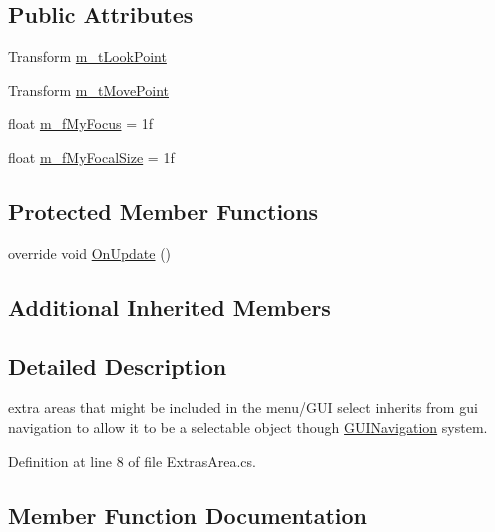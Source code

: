 \subsection*{Public Attributes}
\begin{DoxyCompactItemize}
\item 
Transform \mbox{\hyperlink{class_extras_area_a25c159aed324b87e3fd0a45a6091bc8b}{m\+\_\+t\+Look\+Point}}
\item 
Transform \mbox{\hyperlink{class_extras_area_aec9aa3f2ffb77e4cf45c149b04a6295d}{m\+\_\+t\+Move\+Point}}
\item 
float \mbox{\hyperlink{class_extras_area_aabc862a0031c2e3aa6921ea9a4a60b81}{m\+\_\+f\+My\+Focus}} = 1f
\item 
float \mbox{\hyperlink{class_extras_area_aa377d35bbc6646a177afd002a542f472}{m\+\_\+f\+My\+Focal\+Size}} = 1f
\end{DoxyCompactItemize}
\subsection*{Protected Member Functions}
\begin{DoxyCompactItemize}
\item 
override void \mbox{\hyperlink{class_extras_area_a192d236722e7a6e72facab01513a1d9c}{On\+Update}} ()
\end{DoxyCompactItemize}
\subsection*{Additional Inherited Members}


\subsection{Detailed Description}
extra areas that might be included in the menu/\+G\+UI select inherits from gui navigation to allow it to be a selectable object though \mbox{\hyperlink{class_g_u_i_navigation}{G\+U\+I\+Navigation}} system. 



Definition at line 8 of file Extras\+Area.\+cs.



\subsection{Member Function Documentation}
\mbox{\label{class_extras_area_a7bb3d45f3aa655ba946eab4b0c7f38f4}} 
